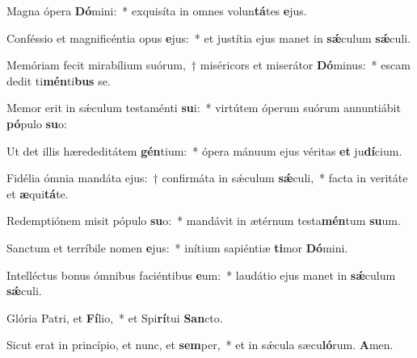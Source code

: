 \item Magna ópera \textbf{Dó}mini:~* exquisíta in omnes volun\textbf{tá}tes \textbf{e}jus.
\item Conféssio et magnificéntia opus \textbf{e}jus:~* et justítia ejus manet in \textbf{sǽ}culum \textbf{sǽ}culi.
\item Memóriam fecit mirabílium suórum,~† miséricors et miserátor \textbf{Dó}minus:~* escam dedit ti\textbf{mén}ti\textbf{bus} se.
\item Memor erit in sǽculum testaménti \textbf{su}i:~* virtútem óperum suórum annuntiábit \textbf{pó}pulo \textbf{su}o:
\item Ut det illis hærededitátem \textbf{gén}tium:~* ópera mánuum ejus véritas \textbf{et} ju\textbf{dí}cium.
\item Fidélia ómnia mandáta ejus:~† confirmáta in sǽculum \textbf{sǽ}culi,~* facta in veritáte et \textbf{æ}qui\textbf{tá}te.
\item Redemptiónem misit pópulo \textbf{su}o:~* mandávit in ætérnum testa\textbf{mén}tum \textbf{su}um.
\item Sanctum et terríbile nomen \textbf{e}jus:~* inítium sapiéntiæ \textbf{ti}mor \textbf{Dó}mini.
\item Intelléctus bonus ómnibus faciéntibus \textbf{e}um:~* laudátio ejus manet in \textbf{sǽ}culum \textbf{sǽ}culi.
\item Glória Patri, et \textbf{Fí}lio,~* et Spi\textbf{rí}tui \textbf{San}cto.
\item Sicut erat in princípio, et nunc, et \textbf{sem}per,~* et in sǽcula sæcu\textbf{ló}rum. \textbf{A}men.
